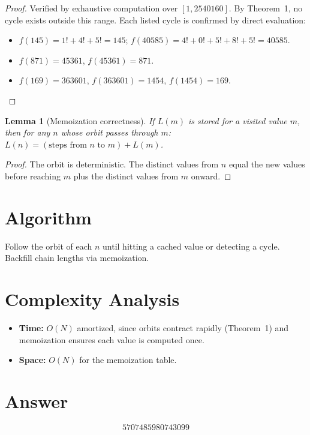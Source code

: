 \documentclass[11pt]{article}
\newtheorem{lemma}[theorem]{Lemma}
\theoremstyle{definition}
\begin{document}
\begin{proof}
Verified by exhaustive computation over $[1, 2540160]$. By Theorem~1, no cycle exists outside this range. Each listed cycle is confirmed by direct evaluation:
\begin{itemize}
\item $f(145) = 1! + 4! + 5! = 145$; $f(40585) = 4! + 0! + 5! + 8! + 5! = 40585$.
\item $f(871) = 45361$, $f(45361) = 871$.
\item $f(169) = 363601$, $f(363601) = 1454$, $f(1454) = 169$.
\end{itemize}
\end{proof}

\begin{lemma}[Memoization correctness]
If $L(m)$ is stored for a visited value $m$, then for any $n$ whose orbit passes through $m$: $L(n) = (\text{steps from } n \text{ to } m) + L(m)$.
\end{lemma}

\begin{proof}
The orbit is deterministic. The distinct values from $n$ equal the new values before reaching $m$ plus the distinct values from $m$ onward.
\end{proof}

\section{Algorithm}

Follow the orbit of each $n$ until hitting a cached value or detecting a cycle. Backfill chain lengths via memoization.

\section{Complexity Analysis}

\begin{itemize}
\item \textbf{Time:} $O(N)$ amortized, since orbits contract rapidly (Theorem~1) and memoization ensures each value is computed once.
\item \textbf{Space:} $O(N)$ for the memoization table.
\end{itemize}

\section{Answer}

\[
\boxed{5707485980743099}
\]
\end{document}
